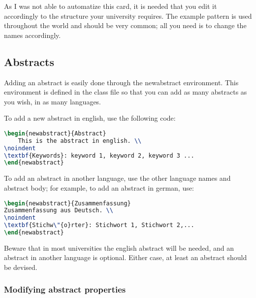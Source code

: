 	As I was not able to automatize this card, it is needed that you edit it accordingly to the structure your university requires. The example pattern is used throughout the world and should be very common; all you need is to change the names accordingly.

	\subsection{Abstracts}%

	Adding an abstract is easily done through the {\ttfamily\small newabstract} environment. This environment is defined in the class file so that you can add as many abstracts as you wish, in as many languages.

	To add a new abstract in english, use the following code:

\begin{lstlisting}[caption = {Adding an abstract in english}, label = {lst:englishAbstract}, style = prettyListing, language = tex]
\begin{newabstract}{Abstract}
	This is the abstract in english. \\
\noindent
\textbf{Keywords}: keyword 1, keyword 2, keyword 3 ...
\end{newabstract}
\end{lstlisting}

	To add an abstract in another language, use the other language names and abstract body; for example, to add an abstract in german, use:

\begin{lstlisting}[caption = {Adding an abstract in german}, label = {lst:germanAbstract}, style = prettyListing, language = tex]
\begin{newabstract}{Zusammenfassung}
Zusammenfassung aus Deutsch. \\
\noindent
\textbf{Stichw\"{o}rter}: Stichwort 1, Stichwort 2,...
\end{newabstract}
\end{lstlisting}
	
	Beware that in most universities the english abstract will be needed, and an abstract in another language is optional. Either case, at least an abstract should be devised.

	\subsubsection{Modifying abstract properties} %

